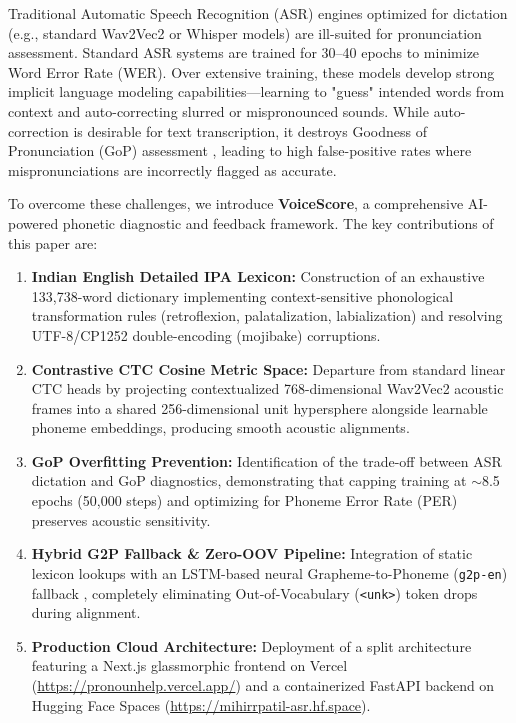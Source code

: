 \documentclass[11pt,a4paper]{article}
\begin{document}
Traditional Automatic Speech Recognition (ASR) engines optimized for dictation (e.g., standard Wav2Vec2 or Whisper models) are ill-suited for pronunciation assessment. Standard ASR systems are trained for 30--40 epochs to minimize Word Error Rate (WER). Over extensive training, these models develop strong implicit language modeling capabilities—learning to "guess" intended words from context and auto-correcting slurred or mispronounced sounds. While auto-correction is desirable for text transcription, it destroys Goodness of Pronunciation (GoP) assessment \cite{witt2000gop}, leading to high false-positive rates where mispronunciations are incorrectly flagged as accurate.

To overcome these challenges, we introduce \textbf{VoiceScore}, a comprehensive AI-powered phonetic diagnostic and feedback framework. The key contributions of this paper are:
\begin{enumerate}
    \item \textbf{Indian English Detailed IPA Lexicon:} Construction of an exhaustive 133,738-word dictionary implementing context-sensitive phonological transformation rules (retroflexion, palatalization, labialization) and resolving UTF-8/CP1252 double-encoding (mojibake) corruptions.
    \item \textbf{Contrastive CTC Cosine Metric Space:} Departure from standard linear CTC heads by projecting contextualized 768-dimensional Wav2Vec2 acoustic frames into a shared 256-dimensional unit hypersphere alongside learnable phoneme embeddings, producing smooth acoustic alignments.
    \item \textbf{GoP Overfitting Prevention:} Identification of the trade-off between ASR dictation and GoP diagnostics, demonstrating that capping training at $\sim$8.5 epochs (50,000 steps) and optimizing for Phoneme Error Rate (PER) preserves acoustic sensitivity.
    \item \textbf{Hybrid G2P Fallback \& Zero-OOV Pipeline:} Integration of static lexicon lookups with an LSTM-based neural Grapheme-to-Phoneme (\texttt{g2p-en}) fallback \cite{rao2015g2p}, completely eliminating Out-of-Vocabulary (\texttt{<unk>}) token drops during alignment.
    \item \textbf{Production Cloud Architecture:} Deployment of a split architecture featuring a Next.js glassmorphic frontend on Vercel (\url{https://pronounhelp.vercel.app/}) and a containerized FastAPI backend on Hugging Face Spaces (\url{https://mihirrpatil-asr.hf.space}).
\end{enumerate}
\end{document}
